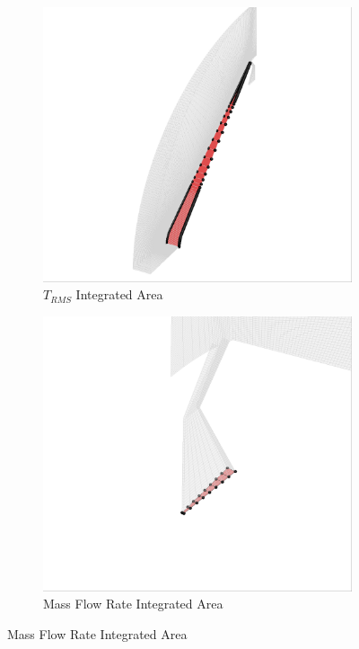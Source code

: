 \begin{figure}[h]
  \centering
	\begin{subfigure}[b]{0.4\textwidth}
    \centering
    \includegraphics[width=\textwidth]{figures/surface2.png}
    \caption{$T_{RMS}$ Integrated Area}
    \label{fig:t-rms-area}
  \end{subfigure}
	\begin{subfigure}[b]{0.4\textwidth}
    \centering
    \includegraphics[width=\textwidth]{figures/plenum_bc.png}
    \caption{Mass Flow Rate Integrated Area}
    \label{fig:plenum-face}
  \end{subfigure}
\end{figure}

